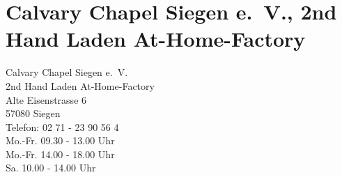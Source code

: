 \section{Calvary Chapel Siegen e.~V., 2nd Hand Laden At-Home-Factory }
Calvary Chapel Siegen e.~V.\\
2nd Hand Laden At-Home-Factory \\
Alte Eisenstrasse 6\\
57080 Siegen \\
Telefon: 02 71 - 23 90 56 4 \\
Mo.-Fr. 09.30 - 13.00 Uhr \\
Mo.-Fr. 14.00 - 18.00 Uhr \\
Sa. 10.00 - 14.00 Uhr 